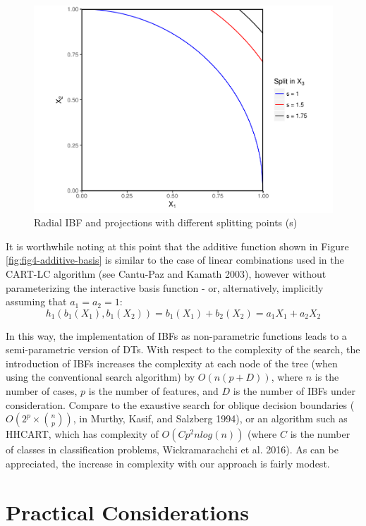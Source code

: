 \documentclass[]{elsarticle} %
\makeatletter
\def\maxwidth{\ifdim\Gin@nat@width>\linewidth\linewidth
\else\Gin@nat@width\fi}
\let\Oldincludegraphics\includegraphics
\renewcommand{\includegraphics}[1]{\Oldincludegraphics[width=\maxwidth]{#1}}
\makeatother
\begin{document}
\begin{figure}[htbp]
\centering
\includegraphics{Trees_with_Base_Functions_files/figure-latex/fig6-radial-basis-1.pdf}
\caption{\label{fig:fig6-radial-basis}Radial IBF and projections with
different splitting points (s)}
\end{figure}

It is worthwhile noting at this point that the additive function shown
in Figure \ref{fig:fig4-additive-basis} is similar to the case of linear
combinations used in the CART-LC algorithm (see Cantu-Paz and Kamath
2003), however without parameterizing the interactive basis function -
or, alternatively, implicitly assuming that \(a_1=a_2=1\): \[
h_1(b_1(X_1),b_1(X_2))=b_1(X_1)+b_2(X_2)=a_1X_1+a_2X_2
\]

In this way, the implementation of IBFs as non-parametric functions
leads to a semi-parametric version of DTs. With respect to the
complexity of the search, the introduction of IBFs increases the
complexity at each node of the tree (when using the conventional search
algorithm) by \(O(n(p+D))\), where \(n\) is the number of cases, \(p\)
is the number of features, and \(D\) is the number of IBFs under
consideration. Compare to the exaustive search for oblique decision
boundaries (\(O(2^p \times{n\choose{p}})\), in Murthy, Kasif, and
Salzberg 1994), or an algorithm such as HHCART, which has complexity of
\(O(Cp^2nlog(n))\) (where \(C\) is the number of classes in
classification problems, Wickramarachchi et al. 2016). As can be
appreciated, the increase in complexity with our approach is fairly
modest.

\hypertarget{practical-considerations}{\section{Practical
Considerations}\label{practical-considerations}}
\end{document}
